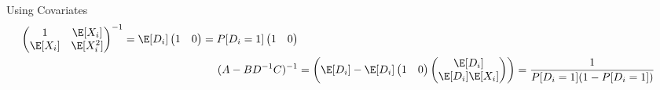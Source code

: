 \documentclass[aspectratio=169, handout]{beamer}
\begin{document}
{\begin{frame}{Using Covariates}
\begin{align*}
  \begin{pmatrix}
    1       & \E[X_i] \\
    \E[X_i] & \E[X_i^2]
  \end{pmatrix}^{-1}
  =
  \E[D_i]
  \begin{pmatrix}
    1 & 0 \\
  \end{pmatrix}
  =
  P[D_i=1]
  \begin{pmatrix}
    1 & 0 \\
  \end{pmatrix}
  \\
  (A-BD^{-1}C)^{-1}
  &=
  \left(
  \E[D_i]
  -
  \E[D_i]
  \begin{pmatrix}
    1 & 0 \\
  \end{pmatrix}
  \begin{pmatrix}
    \E[D_i] \\ \E[D_i] \E[X_i]
  \end{pmatrix}
  \right)
  =
  \frac{1}{P[D_i=1](1-P[D_i=1])}
\end{align*}
\end{frame}
}
\end{document}
